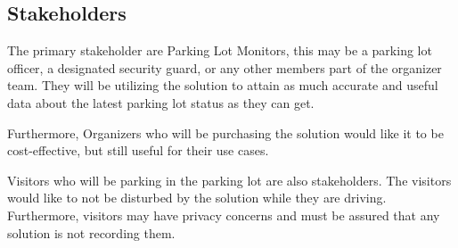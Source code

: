 \documentclass{article}
\begin{document}
\subsection{Stakeholders}
The primary stakeholder are Parking Lot Monitors, this may be a parking lot officer, a designated security guard, or any other members part of the organizer team. They will be utilizing the solution to attain as much accurate and useful data about the latest parking lot status as they can get.

Furthermore, Organizers who will be purchasing the solution would like it to be cost-effective, but still useful for their use cases.

Visitors who will be parking in the parking lot are also stakeholders. The visitors would like to not be disturbed by the solution while they are driving. Furthermore, visitors may have privacy concerns and must be assured that any solution is not recording them.
\end{document}
